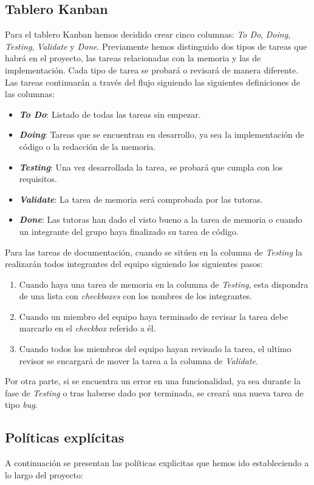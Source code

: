 \subsection{Tablero Kanban}
Para el tablero Kanban hemos decidido crear cinco columnas: \textit{To Do}, \textit{Doing}, \textit{Testing}, \textit{Validate} y \textit{Done}.
Previamente hemos distinguido dos tipos de tareas que habrá en el proyecto, las tareas relacionadas con la memoria y las de implementación. Cada tipo de tarea se probará o revisará de manera diferente.
Las tareas continuarán a través del flujo siguiendo las siguientes definiciones de las columnas:
\begin{itemize}
    \item \textbf{\textit{To Do}}: Listado de todas las tareas sin empezar.
    \item \textbf{\textit{Doing}}: Tareas que se encuentran en desarrollo, ya sea la implementación de código o la redacción de la memoria.
    \item \textbf{\textit{Testing}}: Una vez desarrollada la tarea, se probará que cumpla con los requisitos.
    \item \textbf{\textit{Validate}}: La tarea de memoria será comprobada por las tutoras.
    \item \textbf{\textit{Done}}: Las tutoras han dado el visto bueno a la tarea de memoria o cuando un integrante del grupo haya finalizado su tarea de código.
\end{itemize}
Para las tareas de documentación, cuando se sitúen en la columna de \textit{Testing} la realizarán todos integrantes del equipo siguiendo los siguientes pasos:
\begin{enumerate}
    \item Cuando haya una tarea de memoria en la columna de \textit{Testing}, esta dispondra de una lista con \textit{checkboxes} con los nombres de los integrantes.
    \item Cuando un miembro del equipo haya terminado de revisar la tarea debe marcarlo en el \textit{checkbox} referido a él.
    \item Cuando todos los miembros del equipo hayan revisado la tarea, el ultimo revisor se encargará de mover la tarea a la columna de \textit{Validate}.
\end{enumerate}
Por otra parte, si se encuentra un error en una funcionalidad, ya sea durante la fase de \textit{Testing} o tras haberse dado por terminada, se creará una nueva tarea de tipo \textit{bug}.

\subsection{Políticas explícitas}
A continuación se presentan las políticas explicitas que hemos ido estableciendo a lo largo del proyecto:

